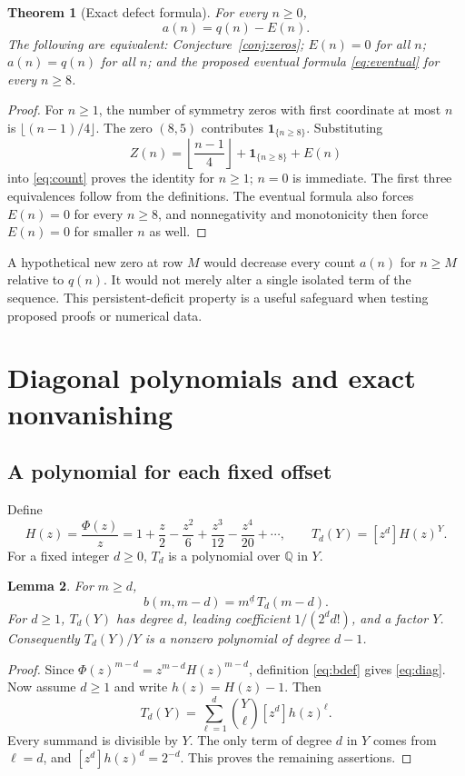 \documentclass[11pt,a4paper]{article}
\numberwithin{equation}{section}
\newtheorem{theorem}{Theorem}[section]
\newtheorem{lemma}[theorem]{Lemma}
\theoremstyle{definition}
\theoremstyle{remark}
\newcommand{\coef}[2]{[#1^{#2}]}
\newcommand{\fall}[2]{#1^{\underline{#2}}}
\newcommand{\ind}[1]{\mathbf{1}_{\{#1\}}}
\newcommand{\Q}{\mathbb Q}
\begin{document}
\begin{theorem}[Exact defect formula]\label{thm:defect}
For every $n\ge0$,
\[
 a(n)=q(n)-E(n).
\]
The following are equivalent: Conjecture~\ref{conj:zeros}; $E(n)=0$ for all
$n$; $a(n)=q(n)$ for all $n$; and the proposed eventual formula
\eqref{eq:eventual} for every $n\ge8$.
\end{theorem}
\begin{proof}
For $n\ge1$, the number of symmetry zeros with first coordinate at most $n$
is $\lfloor(n-1)/4\rfloor$. The zero $(8,5)$ contributes
$\ind{n\ge8}$. Substituting
\[
 Z(n)=\left\lfloor\frac{n-1}{4}\right\rfloor+\ind{n\ge8}+E(n)
\]
into \eqref{eq:count} proves the identity for $n\ge1$; $n=0$ is immediate.
The first three equivalences follow from the definitions. The eventual
formula also forces $E(n)=0$ for every $n\ge8$, and nonnegativity and
monotonicity then force $E(n)=0$ for smaller $n$ as well.
\end{proof}

A hypothetical new zero at row $M$ would decrease every count $a(n)$ for
$n\ge M$ relative to $q(n)$. It would not merely alter a single isolated
term of the sequence. This persistent-deficit property is a useful safeguard
when testing proposed proofs or numerical data.

\section{Diagonal polynomials and exact nonvanishing}\label{sec:diagonals}

\subsection{A polynomial for each fixed offset}
Define
\begin{equation}\label{eq:H}
 H(z)=\frac{\Phi(z)}z
 =1+\frac z2-\frac{z^2}{6}+\frac{z^3}{12}-\frac{z^4}{20}+\cdots,
 \qquad T_d(Y)=\coef{z}{d}H(z)^Y.
\end{equation}
For a fixed integer $d\ge0$, $T_d$ is a polynomial over $\Q$ in $Y$.

\begin{lemma}\label{lem:diagdegree}
For $m\ge d$,
\begin{equation}\label{eq:diag}
 b(m,m-d)=\fall m d\,T_d(m-d).
\end{equation}
For $d\ge1$, $T_d(Y)$ has degree $d$, leading coefficient $1/(2^d d!)$,
and a factor $Y$. Consequently $T_d(Y)/Y$ is a nonzero polynomial of
degree $d-1$.
\end{lemma}
\begin{proof}
Since $\Phi(z)^{m-d}=z^{m-d}H(z)^{m-d}$, definition \eqref{eq:bdef} gives
\eqref{eq:diag}. Now assume $d\ge1$ and write $h(z)=H(z)-1$. Then
\begin{equation}\label{eq:Tbinomial}
 T_d(Y)=\sum_{\ell=1}^d\binom Y\ell\coef{z}{d}h(z)^\ell.
\end{equation}
Every summand is divisible by $Y$. The only term of degree $d$ in $Y$
comes from $\ell=d$, and $\coef{z}{d}h(z)^d=2^{-d}$. This proves the
remaining assertions.
\end{proof}
\end{document}
